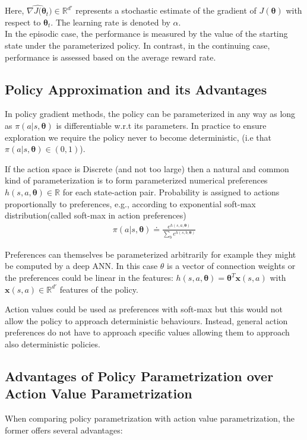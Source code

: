 {Here, $\widehat{\nabla J(\bm{\theta}_t})\in \mathbb{R}^{d'}$ represents a stochastic estimate of the gradient of $J(\bm{\theta})$ with respect to $\bm{\theta}_t$. The learning rate is denoted by $\alpha$.\\

In the episodic case, the performance is measured by the value of the starting state under the parameterized policy. In contrast, in the continuing case, performance is assessed based on the average reward rate.

\subsection{Policy Approximation and its Advantages}
In policy gradient methods, the policy can be parameterized in any way as long as $\pi(a|s, \bm{\theta})$ is differentiable w.r.t its parameters. In practice to ensure exploration we require the policy never to become deterministic, (i.e that $\pi(a|s, \bm{\theta})\in(0,1)$).

If the action space is Discrete (and not too large) then a natural and common kind of parameterization is to form parameterized numerical preferences $h(s,a,\bm{\theta})\in\mathbb{R}$ for each state-action pair.
Probability is assigned to actions proportionally to preferences, e.g., according to exponential soft-max distribution(called soft-max in action preferences)
    \begin{align*}
         \pi(a|s, \bm{\theta})\doteq\frac{e^{h(s,a,\bm{\theta})}}{\sum_b e^{h(s,b,\bm{\theta})}}
    \end{align*}

Preferences can themselves be parameterized arbitrarily for example they might be computed by a deep ANN. In this case $\theta$ is a vector of connection weights or the preferences could be linear in the features: $h(s,a,\bm{\theta})=\bm{\theta}^T\bm{x}(s,a)$ with $\bm{x}(s,a)\in \mathbb{R}^{d'}$ features of the policy.

Action values could be used as preferences with soft-max but this would not allow the policy to approach deterministic behaviours. Instead, general action preferences do not have to approach specific values allowing them to approach also deterministic policies.

\subsection{Advantages of Policy Parametrization over Action Value Parametrization}
When comparing policy parametrization with action value parametrization, the former offers several advantages:

}

